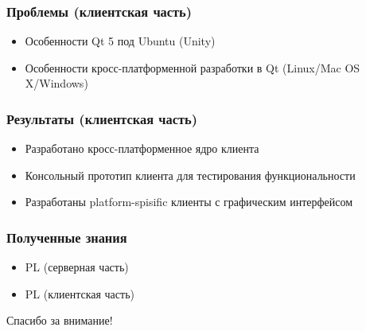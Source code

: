 \documentclass[10pt,pdf,hyperref={unicode}]{beamer}
\begin{document}
        \begin{frame}\frametitle{Проблемы (клиентская часть)}
        \begin{itemize}%
            \item   Особенности Qt 5 под Ubuntu (Unity)
            \item   Особенности кросс-платформенной разработки в Qt (Linux/Mac OS X/Windows)
        \end{itemize}
    \end{frame}
    
    \begin{frame}\frametitle{Результаты (клиентская часть)}
        \begin{itemize}%
            \item	Разработано кросс-платформенное ядро клиента            	
            \item	Консольный прототип клиента для тестирования функциональности
            \item	Разработаны platform-spisific клиенты с графическим интерфейсом
        \end{itemize}
    \end{frame}

    \begin{frame}\frametitle{Полученные знания}
        \begin{itemize}%
            \item	PL (серверная часть)
            \item	PL (клиентская часть)
        \end{itemize}
    \end{frame}

    \begin{frame}
        \begin{center}
            Спасибо за внимание!
        \end{center}
    \end{frame}
\end{document}
